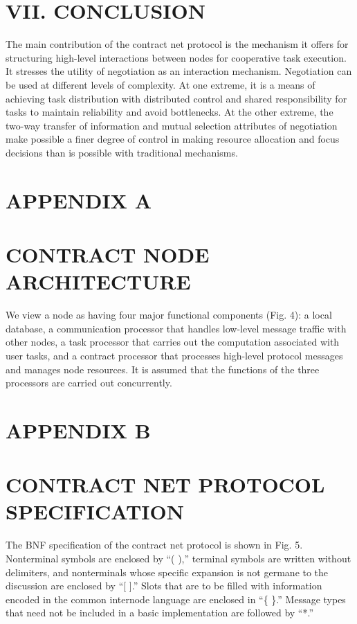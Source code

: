 \documentclass[
]{article}
\begin{document}
\section{VII. CONCLUSION}\label{vii.-conclusion}

The main contribution of the contract net protocol is the mechanism it
offers for structuring high-level interactions between nodes for
cooperative task execution. It stresses the utility of negotiation as an
interaction mechanism. Negotiation can be used at different levels of
complexity. At one extreme, it is a means of achieving task distribution
with distributed control and shared responsibility for tasks to maintain
reliability and avoid bottlenecks. At the other extreme, the two-way
transfer of information and mutual selection attributes of negotiation
make possible a finer degree of control in making resource allocation
and focus decisions than is possible with traditional mechanisms.

\section{APPENDIX A}\label{appendix-a}

\section{CONTRACT NODE ARCHITECTURE}\label{contract-node-architecture}

We view a node as having four major functional components (Fig. 4): a
local database, a communication processor that handles low-level message
traffic with other nodes, a task processor that carries out the
computation associated with user tasks, and a contract processor that
processes high-level protocol messages and manages node resources. It is
assumed that the functions of the three processors are carried out
concurrently.

\section{APPENDIX B}\label{appendix-b}

\section{CONTRACT NET PROTOCOL
SPECIFICATION}\label{contract-net-protocol-specification}

The BNF specification of the contract net protocol is shown in Fig. 5.
Nonterminal symbols are enclosed by ``( ),'' terminal symbols are
written without delimiters, and nonterminals whose specific expansion is
not germane to the discussion are enclosed by ``{[} {]}.'' Slots that
are to be filled with information encoded in the common internode
language are enclosed in ``\{ \}.'' Message types that need not be
included in a basic implementation are followed by ``*.''
\end{document}
